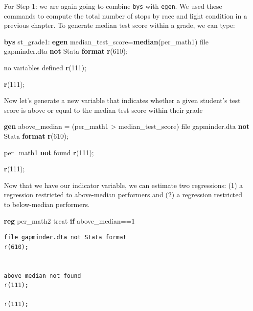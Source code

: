 \documentclass[
]{book}
\newenvironment{Shaded}{\begin{snugshade}}{\end{snugshade}}
\newcommand{\FunctionTok}[1]{\textcolor[rgb]{0.13,0.29,0.53}{\textbf{#1}}}
\newcommand{\KeywordTok}[1]{\textcolor[rgb]{0.13,0.29,0.53}{\textbf{#1}}}
\newcommand{\NormalTok}[1]{#1}
\begin{document}
For Step 1: we are again going to combine \texttt{bys} with \texttt{egen}. We used these commands to compute the total number of stops by race and light condition in a previous chapter. To generate median test score within a grade, we can type:

\begin{Shaded}
\begin{Highlighting}[]
\KeywordTok{bys}\NormalTok{ st\_grade1: }\KeywordTok{egen}\NormalTok{ median\_test\_score=}\KeywordTok{median}\NormalTok{(per\_math1)}
\NormalTok{file gapminder.dta }\KeywordTok{not}\NormalTok{ Stata }\KeywordTok{format}
\FunctionTok{r}\NormalTok{(610);}


\NormalTok{no variables defined}
\FunctionTok{r}\NormalTok{(111);}

\FunctionTok{r}\NormalTok{(111);}
\end{Highlighting}
\end{Shaded}

Now let's generate a new variable that indicates whether a given student's test score is above or equal to the median test score within their grade

\begin{Shaded}
\begin{Highlighting}[]
\KeywordTok{gen}\NormalTok{ above\_median = (per\_math1 \textgreater{} median\_test\_score)}
\NormalTok{file gapminder.dta }\KeywordTok{not}\NormalTok{ Stata }\KeywordTok{format}
\FunctionTok{r}\NormalTok{(610);}


\NormalTok{per\_math1 }\KeywordTok{not}\NormalTok{ found}
\FunctionTok{r}\NormalTok{(111);}

\FunctionTok{r}\NormalTok{(111);}
\end{Highlighting}
\end{Shaded}

Now that we have our indicator variable, we can estimate two regressions: (1) a regression restricted to above-median performers and (2) a regression restricted to below-median performers.

\begin{Shaded}
\begin{Highlighting}[]
\KeywordTok{reg}\NormalTok{ per\_math2 treat }\KeywordTok{if}\NormalTok{ above\_median==1}
\end{Highlighting}
\end{Shaded}

\begin{verbatim}
file gapminder.dta not Stata format
r(610);


above_median not found
r(111);

r(111);
\end{verbatim}
\end{document}
